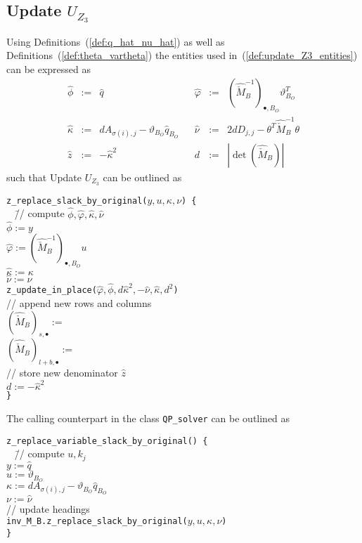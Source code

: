 \documentclass[a4paper]{article}
\begin{document}
\subsection{Update $U_{Z_{3}}$}
Using Definitions~(\ref{def:q_hat_nu_hat}) 
as well as Definitions~(\ref{def:theta_vartheta}) the entities used
in~(\ref{def:update_Z3_entities}) can be expressed as
\begin{equation}
\label{def:update_Z3_entities_prep}
\begin{array}{rclcrcl}
\hat{\phi} &:=& \hat{q}
&&
\hat{\varphi}
&:=&
\left(\hat{\check{M}}_{B}^{-1}\right)_{\bullet, B_{O}}\vartheta_{B_{O}}^{T}
\\
\hat{\kappa} &:=& dA_{\sigma(i), j}-\vartheta_{B_{O}}\hat{q}_{B_{O}}
&&
\hat{\nu} &:=& 2dD_{j,j}-\theta^{T}\hat{\check{M}}_{B}^{-1}\theta
\\
\hat{z} &:=& -\hat{\kappa}^{2}
&&
d &:=& \left|\det(\hat{\check{M}}_{B})\right|
\end{array}
\end{equation}
such that Update $U_{Z_{3}}$ can be outlined as
\begin{tabbing}
\texttt{z\_replace\_slack\_by\_original($y,u,\kappa,\nu$) \{}
\\
\texttt{  } \= // compute $\hat{\phi}, \hat{\varphi}, \hat{\kappa},
\hat{\nu}$ \\
\> \texttt{$\hat{\phi}:=y$} \\
\> \texttt{$\hat{\varphi}:= 
 \left(\hat{\check{M}}_{B}^{-1}\right)_{\bullet, B_{O}}u$} \\
\> \texttt{$\hat{\kappa}:=\kappa$} \\
\> \texttt{$\hat{\nu}:=\nu$} \\
\> \texttt{z\_update\_in\_place($\hat{\varphi}, \hat{\phi},
d\hat{\kappa}^{2}, -\hat{\nu}, \hat{\kappa}, d^{2}$)} \\
\> // append new rows and columns \\
\> $\left(\hat{\check{M}}_{B}\right)_{s, \bullet}:=$ \\
\> $\left(\hat{\check{M}}_{B}\right)_{l+b, \bullet}:=$ \\
\> // store new denominator $\hat{z}$ \\
\> \texttt{$d:=-\hat{\kappa}^{2}$} \\
\texttt{\}}
\end{tabbing}
The calling counterpart in the class \texttt{QP\_solver} can be outlined as
\begin{tabbing}
\texttt{z\_replace\_variable\_slack\_by\_original() \{} \\
\texttt{  } \= // compute $u, k_{j}$ \\
\> \texttt{$y:=\hat{q}$} \\
\> \texttt{$u:=\vartheta_{B_{O}}$} \\
\> \texttt{$\kappa:=dA_{\sigma(i), j}-\vartheta_{B_{O}}\hat{q}_{B_{O}}$} \\
\> \texttt{$\nu:=\hat{\nu}$} \\
\> // update headings \\
\> \texttt{inv\_M\_B.z\_replace\_slack\_by\_original($y, u, \kappa, \nu$)}
\\
\texttt{\}}
\end{tabbing}
\end{document}
